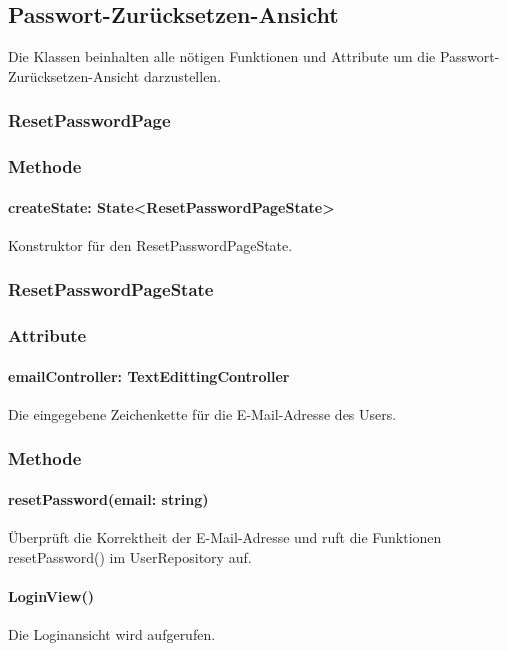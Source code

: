 \documentclass[parskip=full]{scrartcl}
\begin{document}
    \newpage

\subsection{Passwort-Zurücksetzen-Ansicht}
    Die Klassen beinhalten alle nötigen Funktionen und Attribute um die Passwort-Zurücksetzen-Ansicht darzustellen.
    
    \subsubsection{ResetPasswordPage}
        \subsubsection*{Methode}
            \paragraph*{createState: State<ResetPasswordPageState>} Konstruktor für den ResetPasswordPageState.
    
    \subsubsection{ResetPasswordPageState}
        \subsubsection*{Attribute}
            \paragraph*{emailController: TextEdittingController} Die eingegebene Zeichenkette für die E-Mail-Adresse des Users.
    
        \subsubsection*{Methode}
            \paragraph*{resetPassword(email: string)} Überprüft die Korrektheit der E-Mail-Adresse und ruft die Funktionen resetPassword() im UserRepository auf.
            \paragraph*{LoginView()} Die Loginansicht wird aufgerufen.
\end{document}
